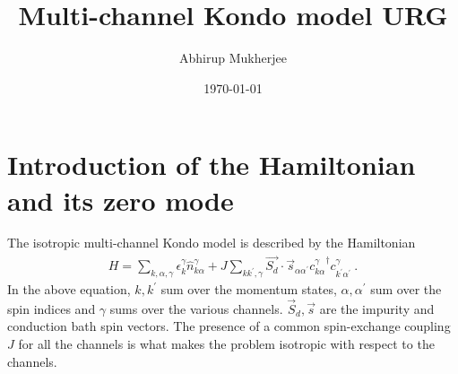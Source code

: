 \documentclass{revtex4-2}
\begin{document}
\title{Multi-channel Kondo model URG}
\author{Abhirup Mukherjee}
\date{\today}
\maketitle
\tableofcontents
\section{Introduction of the Hamiltonian and its zero mode}
The isotropic multi-channel Kondo model \cite{Noz_blandin_1980,Gan_Andrei_Coleman_1993,emery_kivelson,Gan_mchannel_1994,Tsvelick_Weigmann_mchannel_1984,Tsvelick_weigmann_mchannel_1985,parcollet_olivier_large_N,kimura_taro_Su_N_kondo,PhysRevB.73.224445,cox_jarrell_two_channel_rev,affleck_1991_overscreen,Coleman_tsvelik,affleck1993exact} is described by the Hamiltonian
\begin{align}
	\label{mc_ham}
	H = \sum_{k,\alpha,\gamma}\epsilon_{k}^\gamma \hat n^\gamma_{k\alpha} + J\sum_{kk^\prime,\gamma} \vec{S_d}\cdot\vec{s}_{\alpha\alpha^\prime}{c^\gamma_{k\alpha}}^\dagger c^\gamma_{k^\prime\alpha^\prime}~.
\end{align}
In the above equation, \(k,k^\prime\) sum over the momentum states, \(\alpha,\alpha^\prime\) sum over the spin indices and \(\gamma\) sums over the various channels. \(\vec S_d, \vec s\) are the impurity and conduction bath spin vectors. The presence of a common spin-exchange coupling \(J\) for all the channels is what makes the problem isotropic with respect to the channels.
\end{document}
